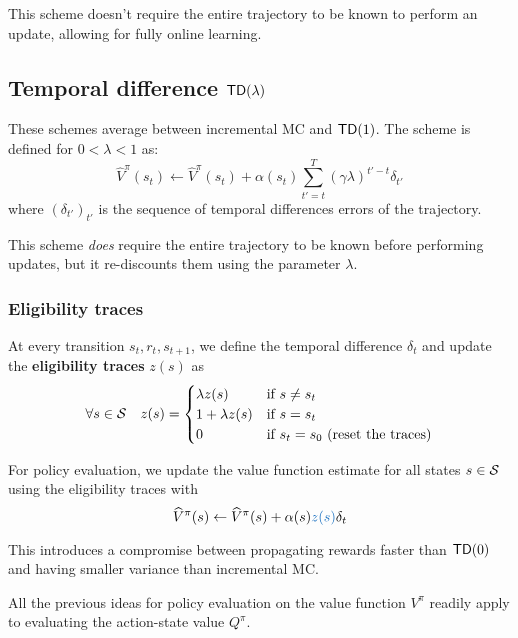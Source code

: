 \documentclass[../course-notes.tex]{subfiles}
\begin{document}
This scheme doesn't require the entire trajectory to be known to perform an update, allowing for fully online learning.



\subsection{Temporal difference $\mathsf{TD}(\lambda)$}

These schemes average between incremental MC and $\mathsf{TD}(1)$. The scheme is defined for $0 < \lambda < 1$ as:
\begin{equation}
	\widehat{V}^\pi(s_t) \leftarrow \widehat{V}^\pi(s_t) + \alpha(s_t) \sum_{t'=t}^T (\gamma\lambda)^{t'-t}\delta_{t'}
\end{equation}
where ${(\delta_{t'})}_{t'}$ is the sequence of temporal differences errors of the trajectory.


This scheme \textit{does} require the entire trajectory to be known before performing updates, but it re-discounts them using the parameter $\lambda$.


\subsubsection{Eligibility traces}

At every transition $s_t,r_t,s_{t+1}$, we define the temporal difference $\delta_t$ and update the \textbf{\bluefont eligibility traces} {\bluefont $z(s)$} as
\[
	\forall s\in\mathcal{S} \quad 
	z(s) = \begin{cases}
	\lambda z(s) &\text{if }s\neq s_t \\
	1 + \lambda z(s)& \text{if }s=s_t \\
	0& \text{if } s_t = s_0 \text{ (reset the traces)}
	\end{cases}
\]

For policy evaluation, we update the value function estimate for all states $s\in\mathcal{S}$ using the eligibility traces with
\begin{equation}
	\widehat{V}^\pi(s) \leftarrow
	\widehat{V}^\pi(s) + \alpha(s){\bluefont z(s)}\delta_t
\end{equation}



This introduces a compromise between propagating rewards faster than $\mathsf{TD}(0)$ and having smaller variance than incremental MC.


\begin{remark}
	All the previous ideas for policy evaluation on the value function $V^\pi$ readily apply to evaluating the action-state value $Q^\pi$.
\end{remark}
\end{document}
